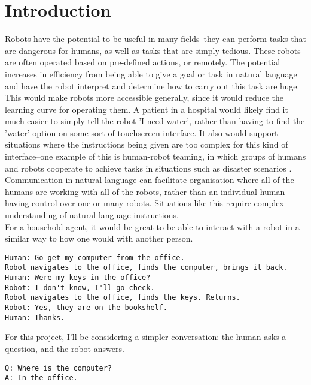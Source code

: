 \chapter{Introduction}
Robots have the potential to be useful in many fields–they can perform tasks that are dangerous for humans, as well as tasks that are simply tedious. These robots are often operated based on pre-defined actions, or remotely. The potential increases in efficiency from being able to give a goal or task in natural language and have the robot interpret and determine how to carry out this task are huge. This would make robots more accessible generally, since it would reduce the learning curve for operating them. A patient in a hospital would likely find it much easier to simply tell the robot 'I need water', rather than having to find the 'water' option on some sort of touchscreen interface. It also would support situations where the instructions being given are too complex for this kind of interface--one example of this is human-robot teaming, in which groups of humans and robots cooperate to achieve tasks in situations such as disaster scenarios \cite{Kruijff-Korbayova:2015aa}. Communication in natural language can facilitate organisation where all of the humans are working with all of the robots, rather than an individual human having control over one or many robots. Situations like this require complex understanding of natural language instructions. \\
For a household agent, it would be great to be able to interact with a robot in a similar way to how one would with another person. 
\begin{verbatim}
Human: Go get my computer from the office. 
Robot navigates to the office, finds the computer, brings it back. 
Human: Were my keys in the office?
Robot: I don't know, I'll go check. 
Robot navigates to the office, finds the keys. Returns.
Robot: Yes, they are on the bookshelf. 
Human: Thanks. 
\end{verbatim}
For this project, I'll be considering a simpler conversation: the human asks a question, and the robot answers. %
\begin{verbatim}
Q: Where is the computer?
A: In the office. 
\end{verbatim}

